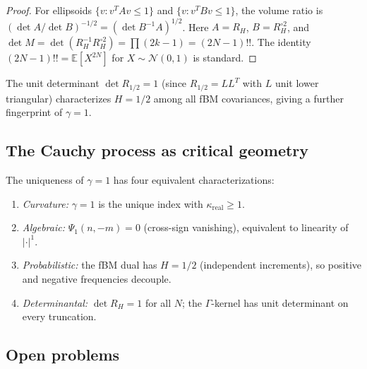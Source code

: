 \documentclass[11pt,a4paper]{article}
\theoremstyle{plain}
\theoremstyle{definition}
\theoremstyle{remark}
\newcommand{\E}{\mathbb{E}}
\begin{document}
\begin{proof}
For ellipsoids $\{v : v^T A v \leq 1\}$ and $\{v : v^T B v \leq 1\}$,
the volume ratio is $(\det A / \det B)^{-1/2} = (\det B^{-1}A)^{1/2}$.
Here $A = R_H$, $B = R_H^{\circ 2}$, and $\det M = \det(R_H^{-1}R_H^{\circ 2})
= \prod(2k-1) = (2N-1)!!$.
The identity $(2N-1)!! = \E[X^{2N}]$ for $X \sim \mathcal{N}(0,1)$
is standard.
\end{proof}

The unit determinant $\det R_{1/2} = 1$ (since $R_{1/2} = LL^T$
with $L$ unit lower triangular) characterizes $H = 1/2$ among
all fBM covariances, giving a further fingerprint of $\gamma = 1$.


\subsection{The Cauchy process as critical geometry}

The uniqueness of $\gamma = 1$ has four equivalent characterizations:
\begin{enumerate}[label=(\alph*)]
\item \emph{Curvature:} $\gamma = 1$ is the unique index with
  $\kappa_{\mathrm{real}} \geq 1$.
\item \emph{Algebraic:} $\Psi_1(n,-m) = 0$ (cross-sign vanishing),
  equivalent to linearity of $|\cdot|^1$.
\item \emph{Probabilistic:} the fBM dual has $H = 1/2$ (independent
  increments), so positive and negative frequencies decouple.
\item \emph{Determinantal:} $\det R_H = 1$ for all $N$; the
  $\Gamma$-kernel has unit determinant on every truncation.
\end{enumerate}


\subsection{Open problems}
\end{document}
